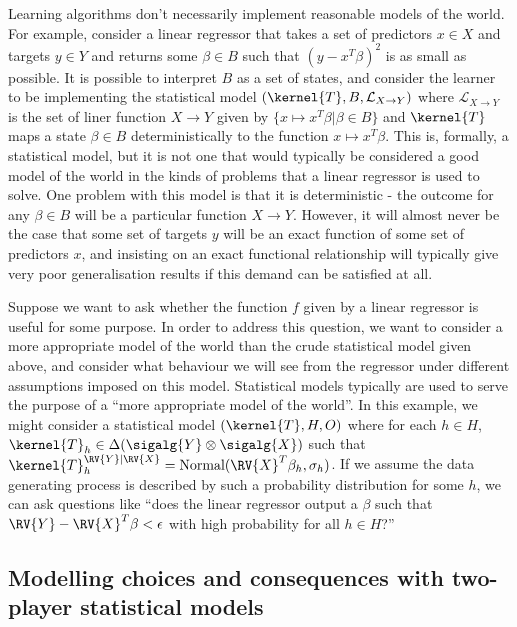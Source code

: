 Learning algorithms don't necessarily implement reasonable models of the world. For example, consider a linear regressor that takes a set of predictors $x\in X$ and targets $y\in Y$ and returns some $\beta\in B$ such that $(y-x^T\beta)^2$ is as small as possible. It is possible to interpret $B$ as a set of states, and consider the learner to be implementing the statistical model $(\kernel{T},B,\mathcal{L}_{X\to Y})$ where $\mathcal{L}_{X\to Y}$ is the set of liner function $X\to Y$ given by $\{x\mapsto x^T\beta|\beta\in B\}$ and $\kernel{T}$ maps a state $\beta\in B$ deterministically to the function $x\mapsto x^T\beta$. This is, formally, a statistical model, but it is not one that would typically be considered a good model of the world in the kinds of problems that a linear regressor is used to solve. One problem with this model is that it is deterministic - the outcome for any $\beta\in B$ will be a particular function $X\to Y$. However, it will almost never be the case that some set of targets $y$ will be an exact function of some set of predictors $x$, and insisting on an exact functional relationship will typically give very poor generalisation results if this demand can be satisfied at all.

Suppose we want to ask whether the function $f$ given by a linear regressor is useful for some purpose. In order to address this question, we want to consider a more appropriate model of the world than the crude statistical model given above, and consider what behaviour we will see from the regressor under different assumptions imposed on this model. Statistical models typically are used to serve the purpose of a ``more appropriate model of the world''. In this example, we might consider a statistical model $(\kernel{T},H,O)$ where for each $h\in H$, $\kernel{T}_h\in \Delta(\sigalg{Y}\otimes\sigalg{X})$ such that $\kernel{T}_h^{\RV{Y}|\RV{X}}=\text{Normal}(\RV{X}^T\beta_h,\sigma_h)$. If we assume the data generating process is described by such a probability distribution for some $h$, we can ask questions like ``does the linear regressor output a $\beta$ such that $\RV{Y}-\RV{X}^T\beta<\epsilon$ with high probability for all $h\in H$?''

\subsection{Modelling choices and consequences with two-player statistical models}

